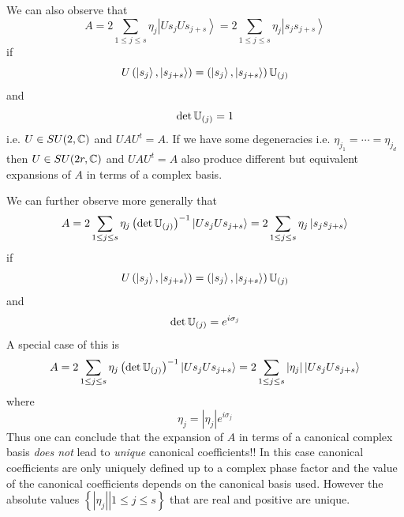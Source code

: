 We can also observe that 
\begin{equation}
A=2\sum_{1\leq j\leq s}\eta _{j}\left\vert Us_{j}Us_{j+s}\right\rangle
=2\sum_{1\leq j\leq s}\eta _{j}\left\vert s_{j}s_{j+s}\right\rangle
\end{equation}%
if 
\begin{equation}
U\left( \left\vert s_{j}\right\rangle ,\left\vert s_{j+s}\right\rangle
\right) =\left( \left\vert s_{j}\right\rangle ,\left\vert
s_{j+s}\right\rangle \right) {\Bbb U}_{\left( j\right) }
\end{equation}%
and 
\begin{equation}
\det {\Bbb U}_{\left( j\right) }=1
\end{equation}%
i.e. $U\in SU(2,{\Bbb C)}$ and $UAU^{t}=A.$ If we have some degeneracies
i.e. $\eta _{j_{1}}=\cdots =\eta _{j_{d}}$ then $U\in SU(2r,{\Bbb C)}$ and $%
UAU^{t}=A$ also produce different but equivalent expansions of $A$ in terms
of a complex basis.

We can further observe more generally that 
\begin{equation}
A=2\sum_{1\leq j\leq s}\eta _{j}\left( \det {\Bbb U}_{\left( j\right)
}\right) ^{-1}\left\vert Us_{j}Us_{j+s}\right\rangle =2\sum_{1\leq j\leq
s}\eta _{j}\left\vert s_{j}s_{j+s}\right\rangle
\end{equation}%
if 
\begin{equation}
U\left( \left\vert s_{j}\right\rangle ,\left\vert s_{j+s}\right\rangle
\right) =\left( \left\vert s_{j}\right\rangle ,\left\vert
s_{j+s}\right\rangle \right) {\Bbb U}_{\left( j\right) }
\end{equation}%
and 
\begin{equation}
\det {\Bbb U}_{\left( j\right) }=e^{i\sigma _{j}}
\end{equation}%
A special case of this is 
\begin{equation}
A=2\sum_{1\leq j\leq s}\eta _{j}\left( \det {\Bbb U}_{\left( j\right)
}\right) ^{-1}\left\vert Us_{j}Us_{j+s}\right\rangle =2\sum_{1\leq j\leq
s}\left\vert \eta _{j}\right\vert \left\vert Us_{j}Us_{j+s}\right\rangle
\end{equation}%
where 
\begin{equation}
\eta _{j}=\left\vert \eta _{j}\right\vert e^{i\sigma _{j}}
\end{equation}%
Thus one can conclude that the expansion of $A$ in terms of a canonical
complex basis {\em does not }lead to {\em unique }canonical coefficients!!
In this case canonical coefficients are only uniquely defined up to a
complex phase factor and the value of the canonical coefficients depends on
the canonical basis used. However the absolute values $\left\{ \left.
\left\vert \eta _{j}\right\vert \right\vert 1\leq j\leq s\right\} $ that are
real and positive are unique.

